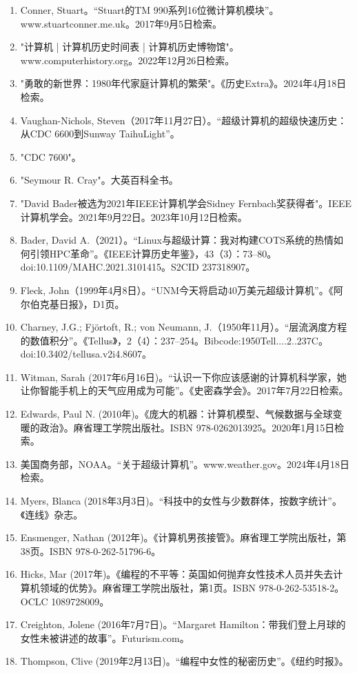 \begin{enumerate}
\item Conner, Stuart。“Stuart的TM 990系列16位微计算机模块”。www.stuartconner.me.uk。2017年9月5日检索。
\item "计算机 | 计算机历史时间表 | 计算机历史博物馆"。www.computerhistory.org。2022年12月26日检索。
\item "勇敢的新世界：1980年代家庭计算机的繁荣"。《历史Extra》。2024年4月18日检索。
\item Vaughan-Nichols, Steven（2017年11月27日）。“超级计算机的超级快速历史：从CDC 6600到Sunway TaihuLight”。
\item "CDC 7600"。
\item "Seymour R. Cray"。大英百科全书。
\item "David Bader被选为2021年IEEE计算机学会Sidney Fernbach奖获得者"。IEEE计算机学会。2021年9月22日。2023年10月12日检索。
\item Bader, David A.（2021）。“Linux与超级计算：我对构建COTS系统的热情如何引领HPC革命”。《IEEE计算历史年鉴》，43（3）：73–80。doi:10.1109/MAHC.2021.3101415。S2CID 237318907。
\item Fleck, John（1999年4月8日）。“UNM今天将启动40万美元超级计算机”。《阿尔伯克基日报》，D1页。
\item Charney, J.G.; Fjörtoft, R.; von Neumann, J.（1950年11月）。“层流涡度方程的数值积分”。《Tellus》，2（4）：237–254。Bibcode:1950Tell....2..237C。doi:10.3402/tellusa.v2i4.8607。
\item Witman, Sarah (2017年6月16日)。“认识一下你应该感谢的计算机科学家，她让你智能手机上的天气应用成为可能”。《史密森学会》。2017年7月22日检索。
\item Edwards, Paul N. (2010年)。《庞大的机器：计算机模型、气候数据与全球变暖的政治》。麻省理工学院出版社。ISBN 978-0262013925。2020年1月15日检索。
\item 美国商务部，NOAA。“关于超级计算机”。www.weather.gov。2024年4月18日检索。
\item Myers, Blanca (2018年3月3日)。“科技中的女性与少数群体，按数字统计”。《连线》杂志。
\item Ensmenger, Nathan (2012年)。《计算机男孩接管》。麻省理工学院出版社，第38页。ISBN 978-0-262-51796-6。
\item Hicks, Mar (2017年)。《编程的不平等：英国如何抛弃女性技术人员并失去计算机领域的优势》。麻省理工学院出版社，第1页。ISBN 978-0-262-53518-2。OCLC 1089728009。
\item Creighton, Jolene (2016年7月7日)。“Margaret Hamilton：带我们登上月球的女性未被讲述的故事”。Futurism.com。
\item Thompson, Clive (2019年2月13日)。“编程中女性的秘密历史”。《纽约时报》。

\end{enumerate}
